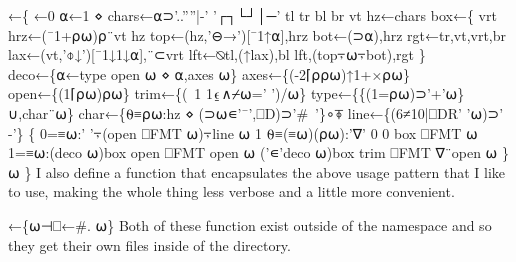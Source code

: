 \documentclass{article}%
\begin{document}
\nwenddocs{}\endmoddef\nwstartdeflinemarkup\nwenddeflinemarkup
{}←\{
         ←0
        ⍺←1 ⋄ chars←⍺⊃'..''''|-' '┌┐└┘│─'
        tl tr bl br vt hz←chars
        box←\{
                vrt hrz←(¯1+⍴⍵)⍴¨vt hz
                top←(hz,'⊖→')[¯1↑⍺],hrz
                bot←(⊃⍺),hrz
                rgt←tr,vt,vrt,br
                lax←(vt,'⌽↓')[¯1↓1↓⍺],¨⊂vrt
                lft←⍉tl,(↑lax),bl
                lft,(top⍪⍵⍪bot),rgt
        \}
        deco←\{⍺←type open ⍵ ⋄ ⍺,axes ⍵\}
        axes←\{(-2⌈⍴⍴⍵)↑1+×⍴⍵\}
        open←\{(1⌈⍴⍵)⍴⍵\}
        trim←\{(~1 1⍷∧⌿⍵=' ')/⍵\}
        type←\{\{(1=⍴⍵)⊃'+'⍵\}∪,char¨⍵\}
        char←\{⍬≡⍴⍵:hz ⋄ (⊃⍵∊'¯',⎕D)⊃'#~'\}∘⍕
        line←\{(6≠10|⎕DR' '⍵)⊃' -'\}
        \{
                0=≡⍵:' '⍪(open ⎕FMT ⍵)⍪line ⍵
                1 ⍬≡(≡⍵)(⍴⍵):'∇' 0 0 box ⎕FMT ⍵
                1=≡⍵:(deco ⍵)box open ⎕FMT open ⍵
                ('∊'deco ⍵)box trim ⎕FMT ∇¨open ⍵
        \}⍵
\}
\eatline
{}\nwendcode{}\nwdocspar
I also define a function {\Tt{}\nwendquote} that encapsulates the above usage
pattern that I like to use, making the whole thing less verbose and
a little more convenient.

\nwenddocs{}\endmoddef\nwstartdeflinemarkup\nwenddeflinemarkup
{}←\{⍵⊣⎕←#. ⍵\}
\eatline
{}\nwendcode{}\nwdocspar
Both of these function exist outside of the {\Tt{}\nwendquote} namespace 
and so they get their own files inside of the {\Tt{}\nwendquote} directory.
\end{document}
